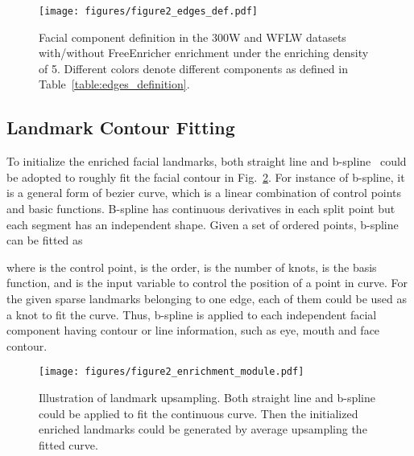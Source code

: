 \documentclass[letterpaper]{article} \usepackage{aaai23}  \usepackage{times}  \usepackage{helvet}  \usepackage{courier}  \usepackage[hyphens]{url}  \usepackage{graphicx} \urlstyle{rm} \def\UrlFont{\rm}  \usepackage{natbib}  \usepackage{caption} \frenchspacing  \setlength{\pdfpagewidth}{8.5in}  \setlength{\pdfpageheight}{11in}  \usepackage{algorithm}
\begin{document}
\begin{figure}[h]
\small
\centering
\texttt{[image: figures/figure2\_edges\_def.pdf]}
\caption{Facial component definition in the 300W and WFLW datasets with/without FreeEnricher enrichment under the enriching density of 5. Different colors denote different components as defined in Table~\ref{table:edges_definition}.}
\label{figure:edges_definition}
\end{figure}

\subsection{Landmark Contour Fitting}
To initialize the enriched facial landmarks, both straight line and b-spline~\cite{knott2000interpolating} could be adopted to roughly fit the facial contour in Fig.~\ref{figure:landmark_contour_upsampling}.
For instance of b-spline, it is a general form of bezier curve, which is a linear combination of control points and basic functions. B-spline has continuous derivatives in each split point but each segment has an independent shape. 
Given a set of ordered points, b-spline can be fitted as

where  is the control point,  is the order,  is the number of knots,  is the basis function, and  is the input variable to control the position of a point in curve. 
For the given sparse landmarks belonging to one edge, each of them could be used as a knot to fit the curve.
Thus, b-spline is applied to each independent facial component having contour or line information, such as eye, mouth and face contour.

\begin{figure}[h]
\begin{center}
\texttt{[image: figures/figure2\_enrichment\_module.pdf]}
\end{center}
   \caption{Illustration of landmark upsampling. Both straight line and b-spline could be applied to fit the continuous curve. Then the initialized enriched landmarks could be generated by average upsampling the fitted curve.
   }
\label{figure:landmark_contour_upsampling}
\end{figure}
\end{document}
